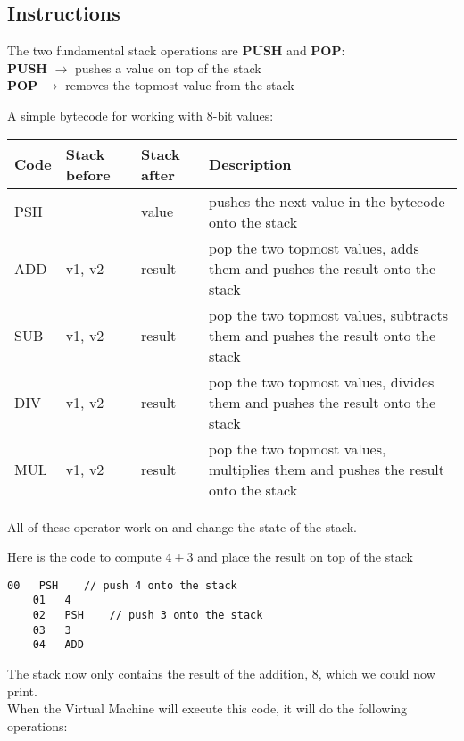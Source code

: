 \documentclass[../documentation.tex]{subfiles}
\begin{document}
\subsection{Instructions}

The two fundamental stack operations are \textbf{PUSH} and \textbf{POP}:
\\
\textbf{PUSH} \(\rightarrow\) pushes a value on top of the stack
\\
\textbf{POP} \(\rightarrow\) removes the topmost value from the stack

A simple bytecode for working with 8-bit values:

\bgroup{}
\def\arraystretch{1.25}
\begin{center}
    \begin{tabular}{ |l|l|l|p{7cm}| }
        \hline
        \textbf{Code} & \textbf{Stack before} & \textbf{Stack after} & \textbf{Description} \\
        \hline
        PSH &  & value & pushes the next value in the bytecode onto the stack \\
        \hline
        ADD & v1, v2 & result & pop the two topmost values, adds them and pushes the result onto the stack \\
        \hline
        SUB & v1, v2 & result & pop the two topmost values, subtracts them and pushes the result onto the stack \\
        \hline
        DIV & v1, v2 & result & pop the two topmost values, divides them and pushes the result onto the stack \\
        \hline
        MUL & v1, v2 & result & pop the two topmost values, multiplies them and pushes the result onto the stack \\
        \hline
    \end{tabular}
\end{center}
\egroup{}

\pagebreak

All of these operator work on and change the state of the stack.

Here is the code to compute \(4+3\) and place the result on top of the stack

\begin{lstlisting}[style=generic]
    00   PSH    // push 4 onto the stack
    01   4
    02   PSH    // push 3 onto the stack
    03   3
    04   ADD
\end{lstlisting}

The stack now only contains the result of the addition, 8, which we could now print.
\\
When the Virtual Machine will execute this code, it will do the following operations:
\end{document}
